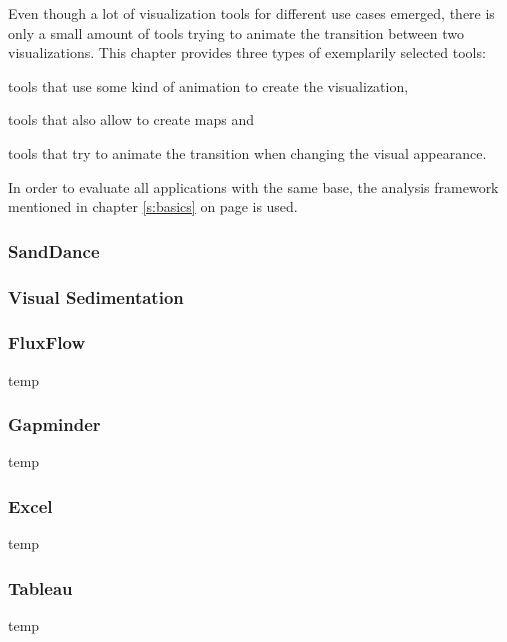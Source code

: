 Even though a lot of visualization tools for different use cases emerged, there is only a small amount of tools trying to animate the transition between two visualizations. This chapter provides three types of exemplarily selected tools:

\begin{enumerate*}
\item tools that use some kind of animation to create the visualization,
\item tools that also allow to create maps and
\item tools that try to animate the transition when changing the visual appearance.
\end{enumerate*}

In order to evaluate all applications with the same base, the analysis framework mentioned in chapter \ref{s:basics} on page \pageref{s:basics} is used.

\subsubsection{SandDance}


\subsubsection{Visual Sedimentation}


\subsubsection{FluxFlow}

temp 

\subsubsection{Gapminder}
temp

\subsubsection{Excel}
temp

\subsubsection{Tableau}
temp 


